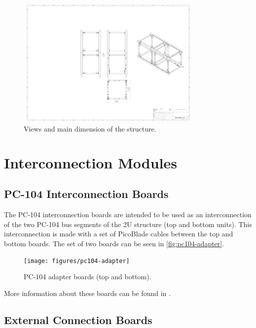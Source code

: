 \begin{figure}[H]
	\begin{center}
		\includegraphics[width=0.8\textwidth, trim=25cm 8cm 30cm 13cm, clip=true]{figures/Structure U2.pdf}
		\caption{Views and main dimension of the structure.}
		\label{fig:structure_views}
	\end{center}
\end{figure}

\section{Interconnection Modules}

\subsection{PC-104 Interconnection Boards}

The PC-104 interconnection boards are intended to be used as an interconnection of the two PC-104 bus segments of the 2U structure (top and bottom units). This interconnection is made with a set of PicoBlade cables between the top and bottom boards. The set of two boards can be seen in \autoref{fig:pc104-adapter}.

\begin{figure}[!ht]
    \begin{center}
        \texttt{[image: figures/pc104-adapter]}
        \caption{PC-104 adapter boards (top and bottom).}
        \label{fig:pc104-adapter}
    \end{center}
\end{figure}

More information about these boards can be found in \cite{pc104-boards}.

\subsection{External Connection Boards}

